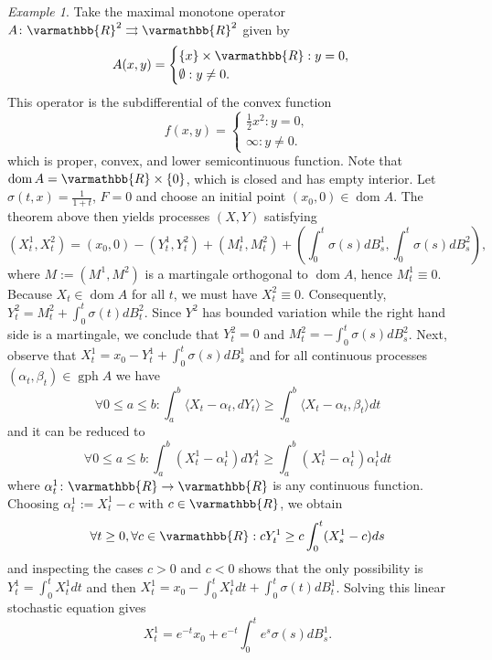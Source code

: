 \documentclass[11pt,reqno]{article}
\let\mathbb=\varmathbb
\newcommand{\R}{\mathbb{R}}
\newcommand{\tto}{\rightrightarrows}
\newcommand{\gph}{\operatorname{gph}}
\newcommand{\dom}{\operatorname{dom}}
\newcommand{\1}{\mathds{1}}
\numberwithin{equation}{section}  %
\theoremstyle{plain}
\theoremstyle{definition}
\theoremstyle{remark}
\newtheorem{example}{Example}
\numberwithin{theorem}{section}
\numberwithin{remark}{section}
\numberwithin{example}{section}
\begin{document}
\begin{example}
    Take the maximal monotone operator $A\colon \R^2\tto \R^2$ given by $$A(x,y) =\begin{cases}
    \{x\}\times \R : y=0,\\
    \emptyset : y\neq 0.
    \end{cases}$$ This operator is the subdifferential of the convex function $$f(x,y) = \begin{cases}\frac{1}{2}x^2 : y=0,\\
    \infty : y\neq 0.
    \end{cases}$$ which is proper, convex, and lower semicontinuous function. Note that $\dom A = \R\times \{0\}$, which is closed and has empty interior. Let $\sigma(t,x) = \frac{1}{1+t}$, $F = 0$ and choose an initial point $(x_0,0)\in \dom A$. The theorem above then yields processes $(X,Y)$ satisfying \begin{equation*}
        (X_t^1,X_t^2) = (x_0,0) - (Y_t^1,Y_t^2) + (M_t^1,M_t^2) + \left(\int_0^t\sigma(s)dB_s^1,\int_{0}^t \sigma(s) dB_s^2\right),
    \end{equation*}
    where $M := (M^1,M^2)$ is a martingale orthogonal to $\dom A$, hence $M_t^1\equiv 0$. Because $X_t\in \dom A$ for all $t$, we must have $X_t^2\equiv 0$. Consequently, $Y_t^2 = M_t^2 + \int_{0}^t \sigma(t) dB_t^2$. Since $Y^2$ has bounded variation while the right hand side is a martingale, we conclude that $Y_t^2 = 0$ and $M_t^2 = -\int_{0}^t \sigma(s) dB_s^2$. Next, observe that $X_t^1 = x_0 - Y_t^1 + \int_0^t \sigma(s)dB_s^1$ and for all continuous processes $(\alpha_t,\beta_t)\in \gph A$ we have 
    \begin{equation*}
        \forall 0\leq a\leq b: \int_a^b \langle X_t-\alpha_t,dY_t\rangle\geq \int_a^b\langle X_t-\alpha_t,\beta_t\rangle dt
    \end{equation*}
    and it can be reduced to
    \begin{equation*}
        \forall 0\leq a\leq b: \int_a^b (X_t^1-\alpha_t^1)dY_t^1\geq \int_a^b (X_t^1-\alpha_t^1)\alpha_t^1dt
    \end{equation*}
    where $\alpha_t^1\colon \R\to \R$ is any continuous function. Choosing $\alpha_t^1 := X_t^1 - c$ with $c\in \R$, we obtain 
    \begin{equation*}
        \forall t\geq 0, \forall c\in \R : cY_t^1\geq c\int_0^t (X_s^1-c)ds
    \end{equation*}
    and inspecting the cases $c>0$ and $c<0$ shows that the only possibility is $Y_t^1 = \int_0^t X_t^1 dt$ and then $X_t^1 = x_0-\int_0^t X_t^1dt +\int_0^t \sigma(t)dB_t^1$. Solving this linear stochastic equation gives
    \begin{equation*}
        X_t^1 = e^{-t} x_0 + e^{-t}\int_0^t e^{s} \sigma(s)dB_s^1.
    \end{equation*}
\end{example}
\end{document}
